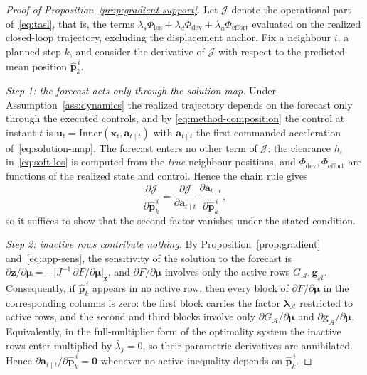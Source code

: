 \documentclass[11pt]{article}
\theoremstyle{plain}
\theoremstyle{definition}
\newcommand{\bx}{\bm{x}}
\newcommand{\bu}{\bm{u}}
\begin{document}
\begin{proof}[Proof of Proposition~\ref{prop:gradient-support}]
	Let $\mathcal{J}$ denote the operational part of~\eqref{eq:tasl},
	that is, the terms
	$\lambda_s\widetilde\Phi_{\mathrm{los}}
		+\lambda_d\Phi_{\mathrm{dev}}
		+\lambda_u\Phi_{\mathrm{effort}}$ evaluated on the realized
	closed-loop trajectory, excluding the displacement anchor. Fix a
	neighbour $i$, a planned step $k$, and consider the derivative of
	$\mathcal{J}$ with respect to the predicted mean position
	$\hat{\bm{p}}^{\,i}_{k}$.

	\emph{Step 1: the forecast acts only through the solution map.}
	Under Assumption~\ref{ass:dynamics} the realized trajectory depends
	on the forecast only through the executed controls, and by
	\eqref{eq:method-composition} the control at instant $t$ is
	$\bu_t=\mathrm{Inner}(\bx_t,\bm{a}_{t\mid t})$ with
	$\bm{a}_{t\mid t}$ the first commanded acceleration
	of~\eqref{eq:solution-map}. The forecast enters no other term of
	$\mathcal{J}$: the clearance $\bar h_t$
	in~\eqref{eq:soft-los} is computed from the \emph{true} neighbour
	positions, and $\Phi_{\mathrm{dev}},\Phi_{\mathrm{effort}}$ are
	functions of the realized state and control. Hence the chain rule
	gives
	\begin{equation}
		\label{eq:app-chain}
		\frac{\partial\mathcal{J}}
		{\partial\hat{\bm{p}}^{\,i}_{k}}
		=\frac{\partial\mathcal{J}}{\partial\bm{a}_{t\mid t}}\,
		\frac{\partial\bm{a}_{t\mid t}}
		{\partial\hat{\bm{p}}^{\,i}_{k}},
	\end{equation}
	so it suffices to show that the second factor vanishes under the
	stated condition.

	\emph{Step 2: inactive rows contribute nothing.} By
	Proposition~\ref{prop:gradient} and~\eqref{eq:app-sens}, the
	sensitivity of the solution to the forecast is
	$\partial\bm{z}/\partial\bm{\mu}
		=-\big[J^{-1}\,\partial F/\partial\bm{\mu}\big]_{\bm{z}}$, and
	$\partial F/\partial\bm{\mu}$ involves only the active rows
	$G_{\mathcal{A}},\bm{g}_{\mathcal{A}}$. Consequently, if
	$\hat{\bm{p}}^{\,i}_{k}$ appears in no active row, then every block
	of $\partial F/\partial\bm{\mu}$ in the corresponding columns is
	zero: the first block carries the factor
	$\bar{\bm{\lambda}}_{\mathcal{A}}$ restricted to active rows, and
	the second and third blocks involve only
	$\partial G_{\mathcal{A}}/\partial\bm{\mu}$ and
	$\partial\bm{g}_{\mathcal{A}}/\partial\bm{\mu}$. Equivalently, in
	the full-multiplier form of the optimality system the inactive rows
	enter multiplied by $\bar\lambda_j=0$, so their parametric
	derivatives are annihilated. Hence
	$\partial\bm{a}_{t\mid t}/\partial\hat{\bm{p}}^{\,i}_{k}=\bm{0}$
	whenever no active inequality depends on $\hat{\bm{p}}^{\,i}_{k}$.


\end{proof}
\end{document}
